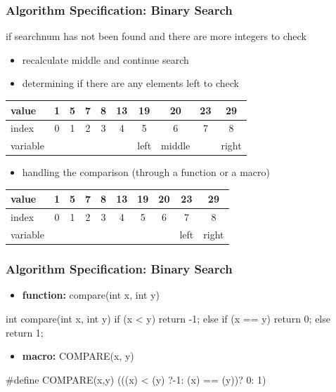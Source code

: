 \documentclass[newPxFont,sthlmFooter,nooffset]{beamer}
\begin{document}
\begin{frame}[t]
	\frametitle{Algorithm Specification: Binary Search}
	if searchnum has not been found
	and there are more integers to check
	\begin{itemize}
		\item recalculate middle and continue search
		\item determining if there are any elements left to check
	\end{itemize}
\begin{center}
	\begin{tabular}{| l || c | c | c | c | c | c | c | c | c |}
		\hline
		value & 1 & 5 & 7 & 8 & 13 & \cellcolor{green}19 & \cellcolor{yellow}20 & 23 & \cellcolor{red}29 \\
		\hline
		index & 0 & 1 & 2 & 3 & 4 & \cellcolor{green}5 & \cellcolor{yellow}6 & 7 & \cellcolor{red}8 \\
		\hline
		variable & & & & & & left & middle & & right \\
		\hline
	\end{tabular}
\end{center}
	\begin{itemize}
		\item handling the comparison (through a function or a macro)
	\end{itemize}
	\begin{center}
		\begin{tabular}{| l || c | c | c | c | c | c | c | c | c |}
			\hline
			value & 1 & 5 & 7 & 8 & 13 & 19 & 20 & \cellcolor{green}23 & \cellcolor{red}29 \\
			\hline
			index & 0 & 1 & 2 & 3 & 4 & 5 & 6 & \cellcolor{green}7 & \cellcolor{red}8 \\
			\hline
			variable & & & & & & & & left & right \\
			\hline
		\end{tabular}
	\end{center}
\end{frame}
\begin{frame}[t, fragile]
  \frametitle{Algorithm Specification: Binary Search}
\begin{itemize}
	\item\textbf {function:} compare(int x, int y)
\end{itemize}

\begin{codedef}
int compare(int x, int y){
	if (x < y) return -1;
	else if (x == y) return 0;
		else return 1;
}
\end{codedef}

\begin{itemize}
	\item\textbf {macro:} COMPARE(x, y)
\end{itemize}

\begin{codedef}
#define COMPARE(x,y) (((x) < (y) ?-1:  (x) == (y))? 0: 1)
\end{codedef}

\end{frame}
\end{document}
